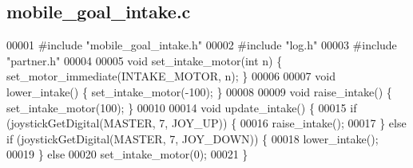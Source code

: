\subsection{mobile\+\_\+goal\+\_\+intake.\+c}
\label{a00131_source}

\begin{DoxyCode}
00001 \textcolor{preprocessor}{#include "mobile_goal_intake.h"}
00002 \textcolor{preprocessor}{#include "log.h"}
00003 \textcolor{preprocessor}{#include "partner.h"}
00004 
00005 \textcolor{keywordtype}{void} set_intake_motor(\textcolor{keywordtype}{int} n) \{ set_motor_immediate(INTAKE_MOTOR, n); \}
00006 
00007 \textcolor{keywordtype}{void} lower_intake() \{ set_intake_motor(-100); \}
00008 
00009 \textcolor{keywordtype}{void} raise_intake() \{ set_intake_motor(100); \}
00010 
00014 \textcolor{keywordtype}{void} update_intake() \{
00015   \textcolor{keywordflow}{if} (joystickGetDigital(MASTER, 7, JOY\_UP)) \{
00016     raise_intake();
00017   \} \textcolor{keywordflow}{else} \textcolor{keywordflow}{if} (joystickGetDigital(MASTER, 7, JOY\_DOWN)) \{
00018     lower_intake();
00019   \} \textcolor{keywordflow}{else}
00020     set_intake_motor(0);
00021 \}
\end{DoxyCode}
